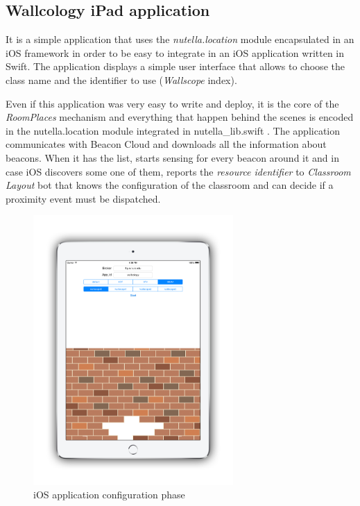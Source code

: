 \subsection{Wallcology iPad application}
It is a simple application that uses the \textit{nutella.location} module encapsulated in an iOS framework in order to be easy to integrate in an iOS application written in Swift. The application displays a simple user interface that allows to choose the class name and the identifier to use (\textit{Wallscope} index).

Even if this application was very easy to write and deploy, it is the core of the \textit{RoomPlaces} mechanism and everything that happen behind the scenes is encoded in the nutella.location module integrated in nutella\_lib.swift \cite{nutella_lib_swift}. The application communicates with Beacon Cloud and downloads all the information about beacons. When it has the list, starts sensing for every beacon around it and in case iOS discovers some one of them, reports the \textit{resource identifier} to \textit{Classroom Layout} bot that knows the configuration of the classroom and can decide if a proximity event must be dispatched.

\begin{figure}
\centering
\includegraphics[width=3in]{images/wallcology-ios.png}
\caption{iOS application configuration phase}
\label{fig:wallcology_ios_config}
\end{figure}


